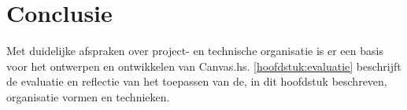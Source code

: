 \section{Conclusie}
Met duidelijke afspraken over project- en technische organisatie is er een basis voor het ontwerpen en ontwikkelen van Canvas.hs. \autoref{hoofdstuk:evaluatie} beschrijft de evaluatie en reflectie van het toepassen van de, in dit hoofdstuk beschreven, organisatie vormen en technieken. 
